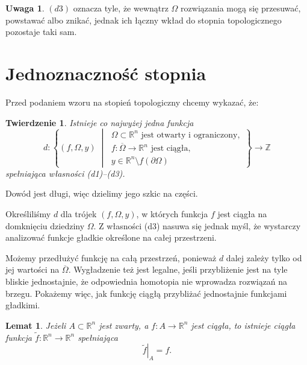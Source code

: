 \documentclass[12pt,a4paper]{article}
\newif\ifchronologia
\theoremstyle{definition}
\newtheorem{uwaga}{Uwaga}
\theoremstyle{plain}
\newtheorem{twierdzenie}{Twierdzenie}
\newtheorem{lemat}{Lemat}
\newcommand{\R}{\mathbb{R}}
\newcommand{\Z}{\mathbb{Z}}
\newcommand{\poczatekwykladu}[1]{%
  \ifchronologia
    \par\addvspace{\baselineskip}%
    \phantomsection
    \addcontentsline{toc}{section}{Wykład #1}%
    \noindent{\large\bfseries Wykład #1}\par\nobreak
    \noindent\rule{\linewidth}{0.4pt}\par\nobreak
    \addvspace{0.5\baselineskip}%
  \fi
}
\begin{document}
\begin{uwaga}
$(d3)$ oznacza tyle, że wewnątrz $\Omega$ rozwiązania mogą się przesuwać, powstawać albo znikać, jednak ich łączny wkład do stopnia topologicznego pozostaje taki sam.
\end{uwaga}

\section{Jednoznaczność stopnia}

Przed podaniem wzoru na stopień topologiczny chcemy wykazać, że:

\begin{twierdzenie}
\label{tw:jednoznacznosc-stopnia}
Istnieje co najwyżej jedna funkcja
\[
d\colon
\left\{
  (f,\Omega,y)\;\middle|\;
  \begin{array}{l}
    \Omega\subset\R^n\text{ jest otwarty i ograniczony},\\
    f\colon\overline{\Omega}\to\R^n\text{ jest ciągła},\\
    y\in\R^n\setminus f(\partial\Omega)
  \end{array}
\right\}
\longrightarrow\Z
\]
spełniająca własności (d1)--(d3).
\end{twierdzenie}

Dowód jest długi, więc dzielimy jego szkic na części.

\medskip

Określiliśmy $d$ dla trójek $(f,\Omega,y)$, w których funkcja $f$ jest ciągła
na domknięciu dziedziny $\Omega$. Z własności (d3) nasuwa się jednak myśl,
że wystarczy analizować funkcje gładkie określone na całej przestrzeni.

Możemy przedłużyć funkcję na całą przestrzeń, ponieważ $d$ dalej zależy tylko
od jej wartości na $\overline{\Omega}$. Wygładzenie też jest legalne, jeśli
przybliżenie jest na tyle bliskie jednostajnie, że odpowiednia homotopia
nie wprowadza rozwiązań na brzegu. Pokażemy więc, jak funkcję ciągłą
przybliżać jednostajnie funkcjami gładkimi.

\medskip

\poczatekwykladu{2}
\begin{lemat}
\label{lem:przedluzenie-funkcji}
Jeżeli $A\subset\R^n$ jest zwarty, a $f\colon A\to\R^n$ jest ciągła,
to istnieje ciągła funkcja $\widetilde{f}\colon\R^n\to\R^n$ spełniająca
\[
  \left.\widetilde{f}\right|_A=f.
\]
\end{lemat}
\end{document}
